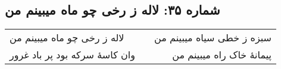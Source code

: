 \begin{center}
\section*{شماره ۳۵: لاله ز رخی چو ماه میبینم من}
\label{sec:035}
\begin{longtable}{l p{0.5cm} r}
لاله ز رخی چو ماه میبینم من
&&
سبزه ز خطی سیاه میبینم من
\\
وان کاسهٔ سرکه بود پر باد غرور
&&
پیمانهٔ خاک راه میبینم من
\\
\end{longtable}
\end{center}
